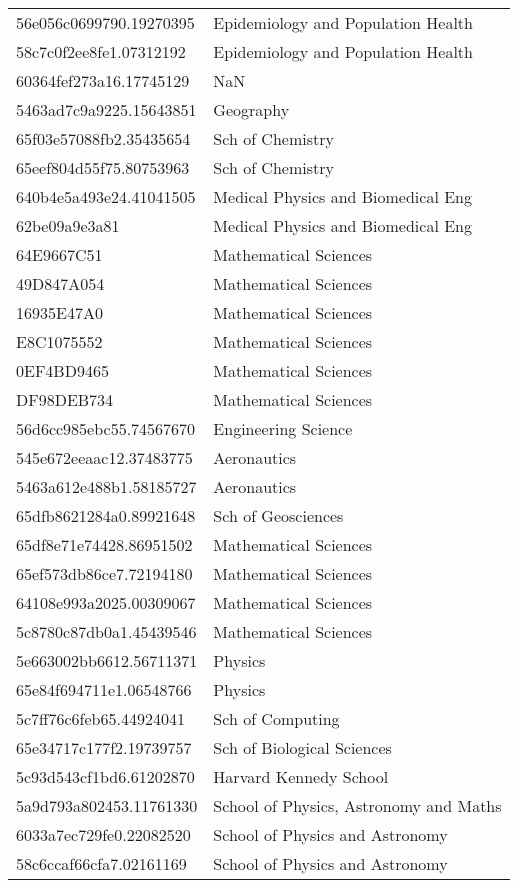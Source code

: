 \begin{tabular}{ll}
56e056c0699790.19270395 & Epidemiology and Population Health \\
58c7c0f2ee8fe1.07312192 & Epidemiology and Population Health \\
60364fef273a16.17745129 & NaN \\
5463ad7c9a9225.15643851 & Geography \\
65f03e57088fb2.35435654 & Sch of Chemistry \\
65eef804d55f75.80753963 & Sch of Chemistry \\
640b4e5a493e24.41041505 & Medical Physics and Biomedical Eng \\
62be09a9e3a81 & Medical Physics and Biomedical Eng \\
64E9667C51 & Mathematical Sciences \\
49D847A054 & Mathematical Sciences \\
16935E47A0 & Mathematical Sciences \\
E8C1075552 & Mathematical Sciences \\
0EF4BD9465 & Mathematical Sciences \\
DF98DEB734 & Mathematical Sciences \\
56d6cc985ebc55.74567670 & Engineering Science \\
545e672eeaac12.37483775 & Aeronautics \\
5463a612e488b1.58185727 & Aeronautics \\
65dfb8621284a0.89921648 & Sch of Geosciences \\
65df8e71e74428.86951502 & Mathematical Sciences \\
65ef573db86ce7.72194180 & Mathematical Sciences \\
64108e993a2025.00309067 & Mathematical Sciences \\
5c8780c87db0a1.45439546 & Mathematical Sciences \\
5e663002bb6612.56711371 & Physics \\
65e84f694711e1.06548766 & Physics \\
5c7ff76c6feb65.44924041 & Sch of Computing \\
65e34717c177f2.19739757 & Sch of Biological Sciences \\
5c93d543cf1bd6.61202870 & Harvard Kennedy School \\
5a9d793a802453.11761330 & School of Physics, Astronomy and Maths \\
6033a7ec729fe0.22082520 & School of Physics and Astronomy \\
58c6ccaf66cfa7.02161169 & School of Physics and Astronomy \\

\end{tabular}
